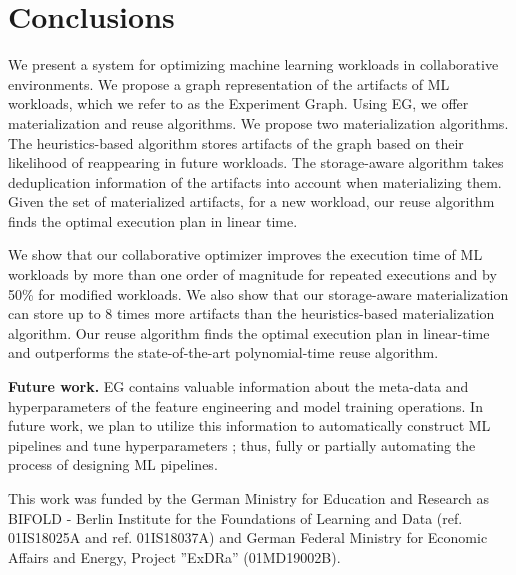 \section{Conclusions} \label{sec-conclusion}
We present a system for optimizing machine learning workloads in collaborative environments.
We propose a graph representation of the artifacts of ML workloads, which we refer to as the Experiment Graph.
Using EG, we offer materialization and reuse algorithms.
We propose two materialization algorithms.
The heuristics-based algorithm stores artifacts of the graph based on their likelihood of reappearing in future workloads.
The storage-aware algorithm takes deduplication information of the artifacts into account when materializing them.
Given the set of materialized artifacts, for a new workload, our reuse algorithm finds the optimal execution plan in linear time.

We show that our collaborative optimizer improves the execution time of ML workloads by more than one order of magnitude for repeated executions and by 50\% for modified workloads.
We also show that our storage-aware materialization can store up to 8 times more artifacts than the heuristics-based materialization algorithm.
Our reuse algorithm finds the optimal execution plan in linear-time and outperforms the state-of-the-art polynomial-time reuse algorithm.

\textbf{Future work.}
EG contains valuable information about the meta-data and hyperparameters of the feature engineering and model training operations.
In future work, we plan to utilize this information to automatically construct ML pipelines and tune hyperparameters \cite{Feurer15, thornton2013auto, shang2019democratizing}; thus, fully or partially automating the process of designing ML pipelines.

\begin{acks}
This work was funded by the German Ministry for Education and Research as BIFOLD - Berlin Institute for the Foundations of Learning and Data (ref. 01IS18025A and ref. 01IS18037A) and German Federal Ministry for Economic Affairs and Energy, Project ”ExDRa” (01MD19002B).
\end{acks}